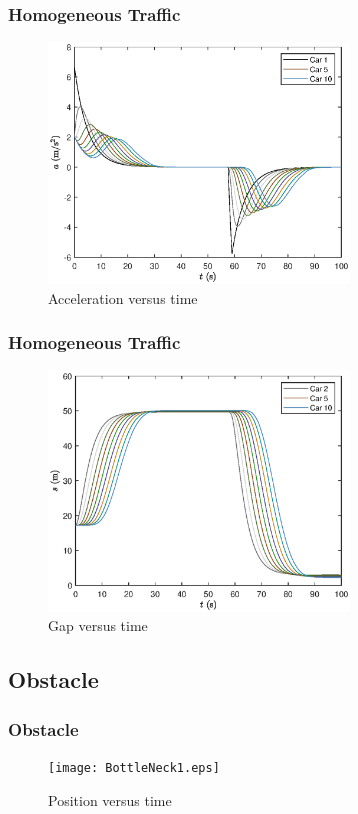\documentclass{beamer}
\begin{document}
\begin{frame}
  \frametitle{Homogeneous Traffic}
  \begin{figure}[H]
    \includegraphics[width=8cm]{HomogeneousTraffic3.eps}
    \caption{Acceleration versus time}
\end{figure}
\end{frame}

\begin{frame}
  \frametitle{Homogeneous Traffic}
  \begin{figure}[H]
    \includegraphics[width=8cm]{HomogeneousTraffic4.eps}
    \caption{Gap versus time}
\end{figure}
\end{frame}

\subsection{Obstacle}

\begin{frame}
  \frametitle{Obstacle}
  \begin{figure}[H]
    \texttt{[image: BottleNeck1.eps]}
    \caption{Position versus time} 
\end{figure}
\end{frame}
\end{document}
